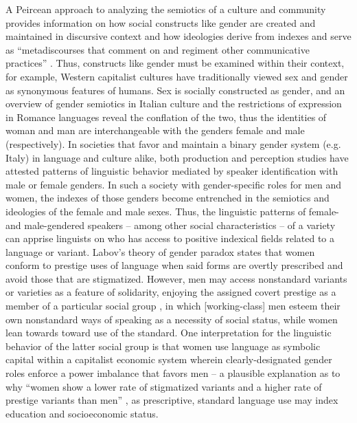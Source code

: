 \documentclass[output=paper,colorlinks,citecolor=brown]{langscibook}
\begin{document}
\par A Peircean approach to analyzing the semiotics of a culture and community provides information on how social constructs like gender are created and maintained in discursive context \citep{ochs90} and how ideologies derive from indexes and serve as “metadiscourses that comment on and regiment other communicative practices” \citep{gals02}. Thus, constructs like gender must be examined within their context, for example, Western capitalist cultures have traditionally viewed sex and gender as synonymous features of humans. Sex is socially constructed as gender, and an overview of gender semiotics in Italian culture and the restrictions of expression in Romance languages reveal the conflation of the two, thus the identities of woman and man are interchangeable with the genders female and male (respectively). In societies that favor and maintain a binary gender system (e.g. Italy) in language and culture alike, both production and perception studies have attested patterns of linguistic behavior mediated by speaker identification with male or female genders. In such a society with gender-specific roles for men and women, the indexes of those genders become entrenched in the semiotics and ideologies of the female and male sexes. Thus, the linguistic patterns of female- and male-gendered speakers – among other social characteristics – of a variety can apprise linguists on who has access to positive indexical fields related to a language or variant. Labov’s theory of gender paradox \citep{labo01} states that women conform to prestige uses of language when said forms are overtly prescribed and avoid those that are stigmatized. However, men may access nonstandard variants or varieties as a feature of solidarity, enjoying the assigned covert prestige as a member of a particular social group \citep{trud72}, in which [working-class] men esteem their own nonstandard ways of speaking as a necessity of social status, while women lean towards toward use of the standard. One interpretation for the linguistic behavior of the latter social group is that women use language as symbolic capital \citep{schi98} within a capitalist economic system wherein clearly-designated gender roles enforce a power imbalance that favors men \citep{fede04} – a plausible explanation as to why “women show a lower rate of stigmatized variants and a higher rate of prestige variants than men” \citep{labo01}, as prescriptive, standard language use may index education and socioeconomic status.
\end{document}
